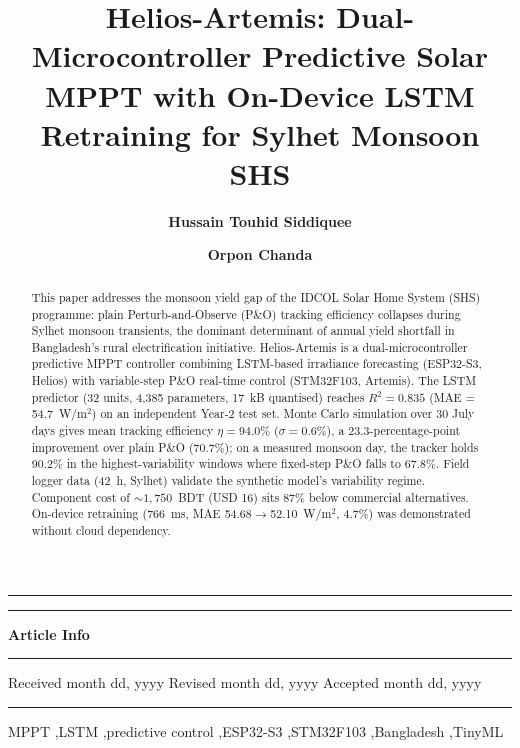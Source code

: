\documentclass{iaesarticle}
\author[1]{\bfseries Hussain Touhid Siddiquee}
\author[1]{\bfseries Orpon Chanda}
\affil[1]{Department of Electrical and Electronic Engineering, Leading University, Sylhet, Bangladesh}
\title{Helios-Artemis: Dual-Microcontroller Predictive Solar MPPT with On-Device LSTM Retraining for Sylhet Monsoon SHS}
\begin{document}
\setcounter{page}{1}
\setlength{\parindent}{1.27cm}
\pagestyle{fancy}
\fancyhfoffset{0cm}


\maketitle

\hrule
\vspace{.1em}
\hrule
\vspace{.5em}
\noindent
\parbox[t][][s]{0.315\textwidth}{%
\textbf{Article Info}
\vspace{.5em}
\hrule
\vspace{.5em}
\begin{history}
\vspace{.5em}
Received month dd, yyyy
Revised month dd, yyyy
Accepted month dd, yyyy
\vspace{.7em}
\end{history}
\vspace{.5em}
\hrule
\vspace{.5em}
\begin{keyword}
\vspace{.5em}
MPPT \sep LSTM \sep predictive control \sep ESP32-S3 \sep STM32F103 \sep Bangladesh \sep TinyML
\vspace{.5em}
\end{keyword}
\vspace{\fill}
}
\parbox{0.020\textwidth}{\hspace{0.5em}}
\parbox[t][][s]{0.65\textwidth}{%
\begin{abstract}
\vspace{.3em}
This paper addresses the monsoon yield gap of the IDCOL Solar Home System (SHS) programme: plain Perturb-and-Observe (P\&O) tracking efficiency collapses during Sylhet monsoon transients, the dominant determinant of annual yield shortfall in Bangladesh's rural electrification initiative. Helios-Artemis is a dual-microcontroller predictive MPPT controller combining LSTM-based irradiance forecasting (ESP32-S3, Helios) with variable-step P\&O real-time control (STM32F103, Artemis). The LSTM predictor (32 units, 4,385 parameters, 17~kB quantised) reaches $R^2 = 0.835$ (MAE = 54.7~W/m$^2$) on an independent Year-2 test set. Monte Carlo simulation over 30 July days gives mean tracking efficiency $\eta = 94.0\%$ ($\sigma = 0.6\%$), a 23.3-percentage-point improvement over plain P\&O (70.7\%); on a measured monsoon day, the tracker holds 90.2\% in the highest-variability windows where fixed-step P\&O falls to 67.8\%. Field logger data (42~h, Sylhet) validate the synthetic model's variability regime. Component cost of ${\sim}1{,}750$~BDT (USD 16) sits 87\% below commercial alternatives. On-device retraining (766~ms, MAE 54.68$\rightarrow$52.10~W/m$^2$, 4.7\%) was demonstrated without cloud dependency.
\end{abstract}
}
\end{document}
